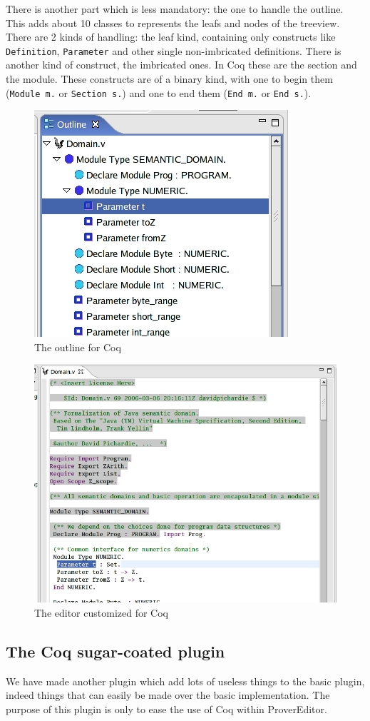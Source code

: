 \documentclass{entcs}
\begin{document}
There is another part which is less mandatory: the one to handle the outline.
This adds about 10 classes to represents the leafs and nodes of the treeview.
There are 2 kinds of handling: the leaf kind, containing only constructs
like {\tt Definition}, {\tt Parameter} and other single non-imbricated
definitions. There is another kind of construct, the imbricated ones.
In Coq these are the section and the module. These constructs are of
a binary kind, with one to begin them ({\tt Module m.} or {\tt Section s.})
and one to end them ({\tt End m.} or {\tt End s.}).\\

\begin{figure}
\begin{center}
\includegraphics[width=0.5\linewidth]{coqoutline}
\end{center}
  \caption{The outline for Coq}
  \label{outline}
\end{figure}
\begin{figure}
\begin{center}
\includegraphics[width=0.6\linewidth]{coqeditor}
\end{center}
  \caption{The editor customized for Coq}
  \label{editor}
\end{figure}
\subsection{The Coq sugar-coated plugin}
We have made another plugin which add lots of useless things to the basic plugin,
indeed things that can easily be made over the basic implementation.
The purpose of this plugin is only to ease the use of Coq within ProverEditor.
\end{document}
